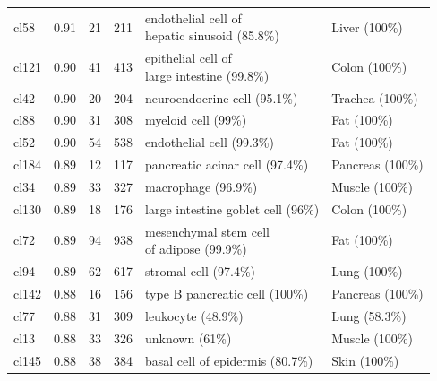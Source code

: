 \begin{table}[ht!]
\begin{tabular}{lrrrll}
  cl58 & 0.91 &  21 & 211 & \specialcell[t]{endothelial cell of\\hepatic sinusoid (85.8\%)} & Liver (100\%) \\ 
  cl121 & 0.90 &  41 & 413 & \specialcell[t]{epithelial cell of\\large intestine (99.8\%)} & Colon (100\%) \\ 
  cl42 & 0.90 &  20 & 204 & neuroendocrine cell (95.1\%) & Trachea (100\%) \\ 
  cl88 & 0.90 &  31 & 308 & myeloid cell (99\%) & Fat (100\%) \\ 
  cl52 & 0.90 &  54 & 538 & endothelial cell (99.3\%) & Fat (100\%) \\ 
  cl184 & 0.89 &  12 & 117 & pancreatic acinar cell (97.4\%) & Pancreas (100\%) \\ 
  cl34 & 0.89 &  33 & 327 & macrophage (96.9\%) & Muscle (100\%) \\ 
  cl130 & 0.89 &  18 & 176 & large intestine goblet cell (96\%) & Colon (100\%) \\ 
  cl72 & 0.89 &  94 & 938 & \specialcell[t]{mesenchymal stem cell\\of adipose (99.9\%)} & Fat (100\%) \\ 
  cl94 & 0.89 &  62 & 617 & stromal cell (97.4\%) & Lung (100\%) \\ 
  cl142 & 0.88 &  16 & 156 & type B pancreatic cell (100\%) & Pancreas (100\%) \\ 
  cl77 & 0.88 &  31 & 309 & leukocyte (48.9\%) & Lung (58.3\%) \\ 
  cl13 & 0.88 &  33 & 326 & unknown (61\%) & Muscle (100\%) \\ 
  cl145 & 0.88 &  38 & 384 & basal cell of epidermis (80.7\%) & Skin (100\%) \\ 
   \bottomrule
\end{tabular}
\end{table}

